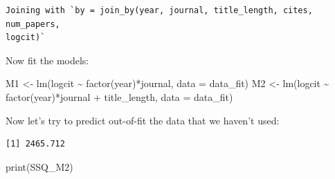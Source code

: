 \documentclass[
  letterpaper,
  DIV=11,
  numbers=noendperiod]{scrreprt}
\newenvironment{Shaded}{\begin{snugshade}}{\end{snugshade}}
\newcommand{\AttributeTok}[1]{\textcolor[rgb]{0.40,0.45,0.13}{#1}}
\newcommand{\DecValTok}[1]{\textcolor[rgb]{0.68,0.00,0.00}{#1}}
\newcommand{\FunctionTok}[1]{\textcolor[rgb]{0.28,0.35,0.67}{#1}}
\newcommand{\NormalTok}[1]{\textcolor[rgb]{0.00,0.23,0.31}{#1}}
\newcommand{\OtherTok}[1]{\textcolor[rgb]{0.00,0.23,0.31}{#1}}
\newcommand{\SpecialCharTok}[1]{\textcolor[rgb]{0.37,0.37,0.37}{#1}}
\begin{document}
\begin{verbatim}
Joining with `by = join_by(year, journal, title_length, cites, num_papers,
logcit)`
\end{verbatim}

Now fit the models:

\begin{Shaded}
\begin{Highlighting}[]
\NormalTok{M1 }\OtherTok{\textless{}{-}} \FunctionTok{lm}\NormalTok{(logcit }\SpecialCharTok{\textasciitilde{}} \FunctionTok{factor}\NormalTok{(year)}\SpecialCharTok{*}\NormalTok{journal, }\AttributeTok{data =}\NormalTok{ data\_fit)}
\NormalTok{M2 }\OtherTok{\textless{}{-}} \FunctionTok{lm}\NormalTok{(logcit }\SpecialCharTok{\textasciitilde{}} \FunctionTok{factor}\NormalTok{(year)}\SpecialCharTok{*}\NormalTok{journal }\SpecialCharTok{+}\NormalTok{ title\_length, }\AttributeTok{data =}\NormalTok{ data\_fit)}
\end{Highlighting}
\end{Shaded}

Now let's try to predict out-of-fit the data that we haven't used:

\begin{Shaded}
\end{Shaded}

\begin{verbatim}
[1] 2465.712
\end{verbatim}

\begin{Shaded}
\begin{Highlighting}[]
\FunctionTok{print}\NormalTok{(SSQ\_M2)}
\end{Highlighting}
\end{Shaded}
\end{document}
